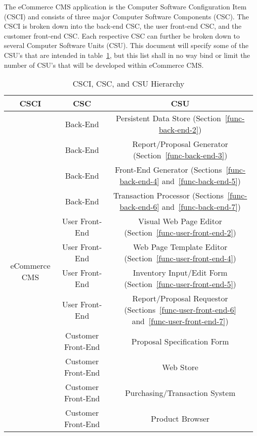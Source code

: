 \documentclass{article}
\begin{document}
The eCommerce CMS application is the Computer Software Configuration Item
(CSCI) and consists of three major Computer Software Components (CSC).  The
CSCI is broken down into the back-end CSC, the user front-end CSC, and the
customer front-end CSC.  Each respective CSC can further be broken down to
several Computer Software Units (CSU).  This document will specify some of the
CSU's that are intended in table~\ref{software-hierarchy}, but this list shall
in no way bind or limit the number of CSU's that will be developed within
eCommerce CMS.

\begin{table}
    \begin{tabular}{|c|c|c|}\hline
        CSCI & CSC & CSU \\\hline\hline
        \multirow{12}{*}{eCommerce CMS}
         & Back-End & Persistent Data Store (Section~\ref{func-back-end-2}) \\\cline{2-3}
         & Back-End & Report/Proposal Generator (Section~\ref{func-back-end-3}) \\\cline{2-3}
         & Back-End & Front-End Generator (Sections~\ref{func-back-end-4} and~\ref{func-back-end-5}) \\\cline{2-3}
         & Back-End & Transaction Processor (Sections~\ref{func-back-end-6} and~\ref{func-back-end-7}) \\\cline{2-3}
         & User Front-End & Visual Web Page Editor (Section~\ref{func-user-front-end-2}) \\\cline{2-3}
         & User Front-End & Web Page Template Editor (Section~\ref{func-user-front-end-4}) \\\cline{2-3}
         & User Front-End & Inventory Input/Edit Form (Section~\ref{func-user-front-end-5}) \\\cline{2-3}
         & User Front-End & Report/Proposal Requestor (Sections~\ref{func-user-front-end-6} and~\ref{func-user-front-end-7}) \\\cline{2-3}
         & Customer Front-End & Proposal Specification Form \\\cline{2-3}
         & Customer Front-End & Web Store \\\cline{2-3}
         & Customer Front-End & Purchasing/Transaction System \\\cline{2-3}
         & Customer Front-End & Product Browser \\\hline
    \end{tabular}
    \caption{CSCI, CSC, and CSU Hierarchy}
    \label{software-hierarchy}
\end{table}
\end{document}
